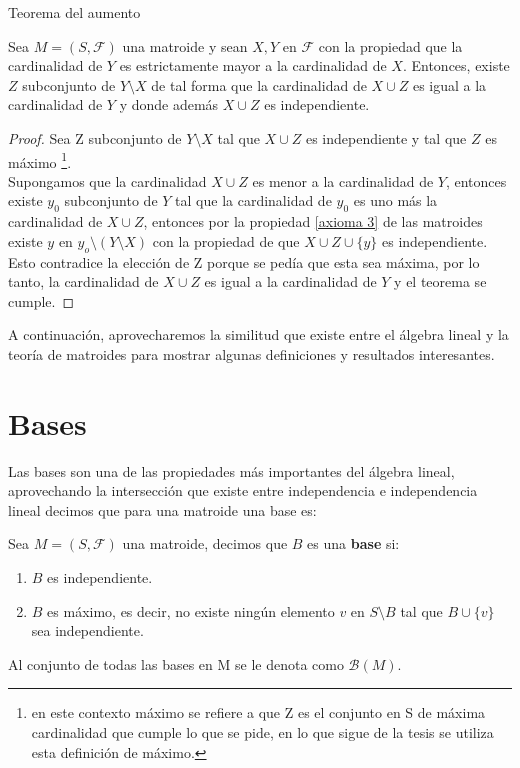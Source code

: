 \begin{teo}{Teorema del aumento} \label{augmentation}

Sea $M=(S,\mathcal{F})$ una matroide y sean $X,Y$ en $\mathcal{F}$ con la propiedad que la cardinalidad de $Y$ es estrictamente mayor a la cardinalidad de $X$. Entonces, existe $Z$ subconjunto de $Y \setminus X$ de tal forma que la cardinalidad de $X \cup Z$ es igual a la cardinalidad de $Y$ y donde además $X \cup Z$ es independiente. 
\end{teo}
\begin{proof}
Sea Z subconjunto de $Y \setminus X$ tal que $X \cup Z$ es independiente y tal que $Z$ es máximo \footnote{en este contexto máximo se refiere a que Z es el conjunto en S de máxima cardinalidad que cumple lo que se pide, en lo que sigue de la tesis se utiliza esta definición de máximo.}. \\ 
Supongamos que la cardinalidad $X \cup Z$ es menor a la cardinalidad de $Y$, entonces existe $y_0$ subconjunto de $Y$ tal que la cardinalidad de $y_0$ es uno más la cardinalidad de $X \cup Z$, entonces por la propiedad \ref{axioma 3} de las matroides existe $y$ en $y_o \setminus (Y \setminus X)$ con la propiedad de que $X \cup Z \cup \{ y\}$ es independiente. Esto contradice la elección de Z porque se pedía que esta sea máxima, por lo tanto, la cardinalidad de $X \cup Z$ es igual a la cardinalidad de $Y$ y el teorema se cumple. 
\end{proof}

A continuación, aprovecharemos la similitud que existe entre el álgebra lineal y la teoría de matroides para mostrar algunas definiciones y resultados interesantes. 

\section{Bases}

Las bases son una de las propiedades más importantes del álgebra lineal, aprovechando la intersección que existe entre independencia e independencia lineal decimos que para una matroide una base es: 

\begin{dfn}
Sea $M=(S,\mathcal{F})$ una matroide, decimos que ${B}$ es una \textbf{base} si:
\begin{enumerate}
\item ${B}$ es independiente.
\item ${B}$ es máximo, es decir, no existe ningún elemento $v$ en $S \setminus {B}$ tal que ${B} \cup \{v\}$ sea independiente.
\end{enumerate}
Al conjunto de todas las bases en M se le denota como $\mathcal{B}(M)$.
\end{dfn}

